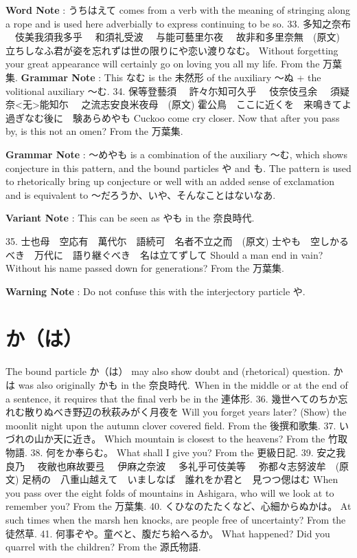 \par{\textbf{Word Note }: うちはえて comes from a verb with the meaning of stringing along a rope and is used here adverbially to express continuing to be so. }
33. 多知之奈布 　伎美我須我多乎 　和須礼受波 　与能可藝里尓夜 　故非和多里奈無　(原文) \hfill\break
立ちしなふ君が姿を忘れずは世の限りにや恋い渡りなむ。 \hfill\break
Without forgetting your great appearance will certainly go on loving you all my life. \hfill\break
From the 万葉集.  \textbf{Grammar Note }: This なむ is the 未然形 of the auxiliary ～ぬ + the volitional auxiliary ～む.  34. 保等登藝須 　許々尓知可久乎 　伎奈伎弖余 　須疑奈<无>能知尓 　之流志安良米夜母　(原文) \hfill\break
霍公鳥　ここに近くを　来鳴きてよ　過ぎなむ後に　験あらめやも \hfill\break
Cuckoo come cry closer. Now that after you pass by, is this not an omen? \hfill\break
From the 万葉集.  
\par{\textbf{Grammar Note }: ～めやも is a combination of the auxiliary ～む, which shows conjecture in this pattern, and the bound particles や and も. The pattern is used to rhetorically bring up conjecture or well with an added sense of exclamation and is equivalent to ～だろうか、いや、そんなことはないなあ. }

\par{\textbf{Variant Note }: This can be seen as やも in the 奈良時代. }

\par{35. 士也母　空応有　萬代尓　語続可　名者不立之而　(原文) \hfill\break
士やも　空しかるべき　万代に　語り継ぐべき　名は立てずして \hfill\break
Should a man end in vain? Without his name passed down for generations? \hfill\break
From the 万葉集. }

\par{\textbf{Warning Note }: Do not confuse this with the interjectory particle や. }
      
\section{か（は）}
 \hfill\break
 The bound particle か（は） may also show doubt and (rhetorical) question. かは was also originally かも in the 奈良時代. When in the middle or at the end of a sentence, it requires that the final verb be in the 連体形.  36. 幾世へてのちか忘れむ散りぬべき野辺の秋萩みがく月夜を \hfill\break
Will you forget years later? (Show) the moonlit night upon the autumn clover covered field. \hfill\break
From the 後撰和歌集.  37. いづれの山か天に近き。 \hfill\break
Which mountain is closest to the heavens? \hfill\break
From the 竹取物語.  38. 何をか奉らむ。 \hfill\break
What shall I give you? \hfill\break
From the 更級日記.  39. 安之我良乃 　夜敝也麻故要弖 　伊麻之奈波 　多礼乎可伎美等 　弥都々志努波牟　(原文) \hfill\break
足柄の　八重山越えて　いましなば　誰れをか君と　見つつ偲はむ \hfill\break
When you pass over the eight folds of mountains in Ashigara, who will we look at to remember you? \hfill\break
From the 万葉集.  40. くひなのたたくなど、心細からぬかは。 \hfill\break
At such times when the marsh hen knocks, are people free of uncertainty? \hfill\break
From the 徒然草.  41. 何事ぞや。童べと、腹だち給へるか。 \hfill\break
What happened? Did you quarrel with the children? \hfill\break
From the 源氏物語.       
